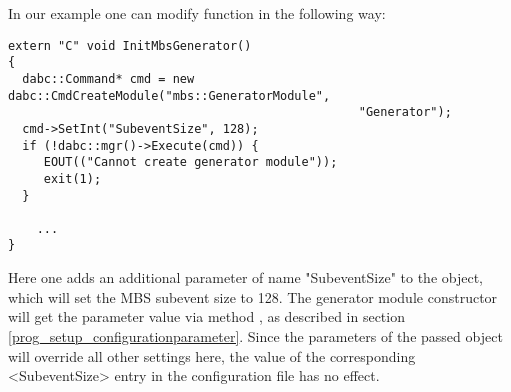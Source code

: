 In our example one can modify  function in the following way:
\begin{small}
\begin{verbatim}
extern "C" void InitMbsGenerator() 
{
  dabc::Command* cmd = new dabc::CmdCreateModule("mbs::GeneratorModule", 
                                                 "Generator");
  cmd->SetInt("SubeventSize", 128);
  if (!dabc::mgr()->Execute(cmd)) {
     EOUT(("Cannot create generator module"));
     exit(1);
  }
    
    ...
}
\end{verbatim}
\end{small}

Here one adds an additional parameter of name "SubeventSize" to
the  object, 
which will set the MBS subevent size to 128. 
The generator module constructor will get the parameter value via method
, as described in section \ref{prog_setup_configurationparameter}.
Since the parameters of the passed  object will override all other settings here,
the value of the corresponding <SubeventSize> entry in the configuration file has no effect.

